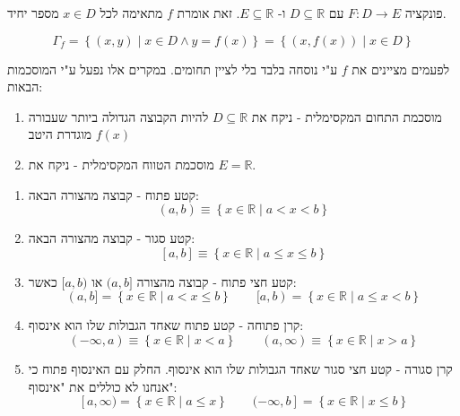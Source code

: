 \documentclass{tstextbook}
\begin{document}
\begin{definition}
פונקציה \(F:D\to E\) עם \(D\subseteq \mathbb{R}\) ו- \(E\subseteq \mathbb{R}\). זאת אומרת \(f\) מתאימה לכל \(x \in D\) מספר יחיד.

\end{definition}
\begin{definition}
$$\Gamma_{f}=\left\{  (x,y)\mid x \in D\land y=f(x)  \right\}=\left\{  (x,f(x))\mid x \in D  \right\}$$

\end{definition}
\begin{remark}
לפעמים מציינים את \(f\) ע"י נוסחה בלבד בלי לציין תחומים. במקרים אלו נפעל ע"י המוסכמות הבאות:

  \begin{enumerate}
    \item מוסכמת התחום המקסימלית - ניקח את \(D\subseteq \mathbb{R}\) להיות הקבוצה הגדולה ביותר שעבורה \(f(x)\) מוגדרת היטב 


    \item מוסכמת הטווח המקסימלית - ניקח את \(E=\mathbb{R}\). 


  \end{enumerate}
\end{remark}
\begin{definition}
  \begin{enumerate}
    \item קטע פתוח - קבוצה מהצורה הבאה: 
$$(a,b)\equiv\left\{  x \in \mathbb{R}\mid a<x<b  \right\}$$


    \item קטע סגור - קבוצה מהצורה הבאה: 
$$[a,b]\equiv \left\{  x \in \mathbb{R}  \mid a\leq x \leq b\right\}$$


    \item קטע חצי פתוח - קבוצה מהצורה \((a,b]\) או \([a,b)\) כאשר: 
$$\left( a,b]=\left\{  x \in \mathbb{R}\mid a<x\leq b  \right\}\qquad [a,b \right)=\left\{  x \in \mathbb{R}\mid a\leq x< b  \right\}$$


    \item קרן פתוחה - קטע פתוח שאחד הגבולות שלו הוא אינסוף: 
$$\left( -\infty,a \right)\equiv \left\{  x \in \mathbb{R} \mid x< a \right\}\qquad \left( a,\infty \right)\equiv\left\{  x \in \mathbb{R}\mid x> a  \right\}$$


    \item קרן סגורה - קטע חצי סגור שאחד הגבולות שלו הוא אינסוף. החלק עם האינסוף פתוח כי אנחנו לא כוללים את "אינסוף": 
$$\left[ a,\infty)=\left\{ x \in \mathbb{R}\mid a\leq x   \right\}\qquad (-\infty,b \right]=\left\{  x \in \mathbb{R}\mid x\leq b  \right\}$$


  \end{enumerate}
\end{definition}
\end{document}
